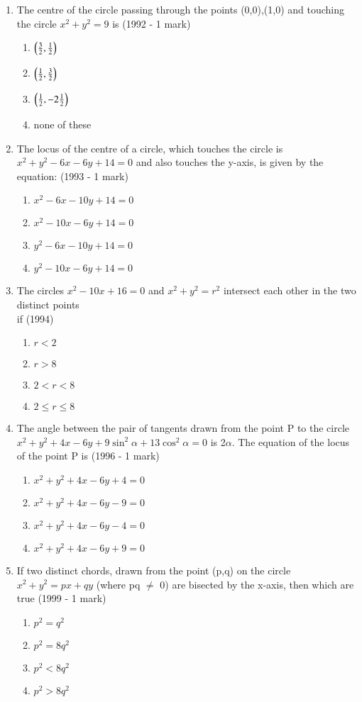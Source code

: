 \documentclass[journal,12pt,twocolumn]{IEEEtran}
\theoremstyle{remark}
\begin{document}
\begin{enumerate}
\begin{enumerate}
    \end{enumerate}
    \item The centre of the circle passing through the points (0,0),(1,0) and touching the circle $x^{2}+y^{2}=9$ is
    \hfill {(1992 - 1 mark)}
    \begin{enumerate}
    \item $\left(\frac{3}{2},\frac{1}{2}\right)$
    \item $\left(\frac{1}{2},\frac{3}{2}\right)$
    \item $\left(\frac{1}{2},-2\frac{1}{2}\right)$
    \item none of these
    \end{enumerate}
    \item The locus of the centre of a circle, which touches the circle is $x^{2}+y^{2}-6x-6y+14=0$ and also touches the y-axis, is given by the equation: \hfill {(1993 - 1 mark)}
    \begin{enumerate}
    \item $x^{2}-6x-10y+14=0$
    \item $x^{2}-10x-6y+14=0$
    \item $y^{2}-6x-10y+14=0$
    \item $y^{2}-10x-6y+14=0$
    \end{enumerate}
    \item The circles $x^{2}-10x+16=0$ and $x^{2}+y^{2}=r^{2}$ intersect each other in the two distinct points\\ if
    \hfill {(1994)}
    \begin{enumerate}
    \item $r<2$
    \item $r>8$
    \item $2<r<8$
    \item $2\leq r\leq8$
    \end{enumerate}
    \item The angle between the pair of tangents drawn from the point P to the circle $x^{2}+y^{2}+4x-6y+9\sin^{2}{\alpha}+13\cos^{2}{\alpha}=0$ is 2$\alpha$. The equation of the locus of the point P is
    \hfill {(1996 - 1 mark)}
    \begin{enumerate}
    \item $x^{2}+y^{2}+4x-6y+4=0$
    \item $x^{2}+y^{2}+4x-6y-9=0$
    \item $x^{2}+y^{2}+4x-6y-4=0$
    \item $x^{2}+y^{2}+4x-6y+9=0$
    \end{enumerate}
    \item If two distinct chords, drawn from the point (p,q) on the circle $x^{2}+y^{2}=px+qy$ (where pq $\neq$ 0) are bisected by the x-axis, then which are true
    \hfill {(1999 - 1 mark)}
    \begin{enumerate}
    \item $p^{2}=q^{2}$
    \item $p^{2}=8q^{2}$ 
    \item $p^{2}<8q^{2}$
    \item $p^{2}>8q^{2}$
    \end{enumerate}
    
\end{enumerate}
\end{document}
